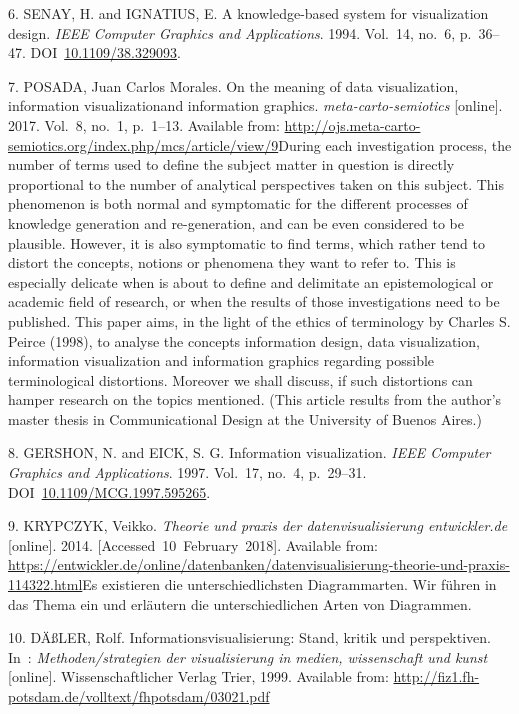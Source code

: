 \documentclass[american,a4paper,oneside,,tablecaptionabove]{scrbook}
\begin{document}
\hypertarget{ref-Senay.1994}{}
6. SENAY, H. and IGNATIUS, E. A knowledge-based system for visualization
design. \emph{IEEE Computer Graphics and Applications}. 1994. Vol.~14,
no.~6, p.~36--47.
DOI~\href{https://doi.org/10.1109/38.329093}{10.1109/38.329093}.

\hypertarget{ref-Posada.2017}{}
7. POSADA, Juan Carlos Morales. On the meaning of data visualization,
information visualizationand information graphics.
\emph{meta-carto-semiotics} {[}online{]}. 2017. Vol.~8, no.~1, p.~1--13.
Available from:
\url{http://ojs.meta-carto-semiotics.org/index.php/mcs/article/view/9}During
each investigation process, the number of terms used to define the
subject matter in question is directly proportional to the number of
analytical perspectives taken on this subject. This phenomenon is both
normal and symptomatic for the different processes of knowledge
generation and re-generation, and can be even considered to be
plausible. However, it is also symptomatic to find terms, which rather
tend to distort the concepts, notions or phenomena they want to refer
to. This is especially delicate when is about to define and delimitate
an epistemological or academic field of research, or when the results of
those investigations need to be published. This paper aims, in the light
of the ethics of terminology by Charles S. Peirce (1998), to analyse
the concepts information design, data visualization, information
visualization and information graphics regarding possible terminological
distortions. Moreover we shall discuss, if such distortions can hamper
research on the topics mentioned. (This article results from the
author's master thesis in Communicational Design at the University of
Buenos Aires.)

\hypertarget{ref-Gershon.1997}{}
8. GERSHON, N. and EICK, S. G. Information visualization. \emph{IEEE
Computer Graphics and Applications}. 1997. Vol.~17, no.~4, p.~29--31.
DOI~\href{https://doi.org/10.1109/MCG.1997.595265}{10.1109/MCG.1997.595265}.

\hypertarget{ref-Krypczyk.2014}{}
9. KRYPCZYK, Veikko. \emph{Theorie und praxis der datenvisualisierung
\textbar{} entwickler.de} {[}online{]}. 2014.
{[}Accessed~10~February~2018{]}. Available from:
\url{https://entwickler.de/online/datenbanken/datenvisualisierung-theorie-und-praxis-114322.html}Es
existieren die unterschiedlichsten Diagrammarten. Wir führen in das
Thema ein und erläutern die unterschiedlichen Arten von Diagrammen.

\hypertarget{ref-Dassler.1999}{}
10. DÄßLER, Rolf. Informationsvisualisierung: Stand, kritik und
perspektiven. In~: \emph{Methoden/strategien der visualisierung in
medien, wissenschaft und kunst} {[}online{]}. Wissenschaftlicher Verlag
Trier, 1999. Available from:
\url{http://fiz1.fh-potsdam.de/volltext/fhpotsdam/03021.pdf}
\end{document}

